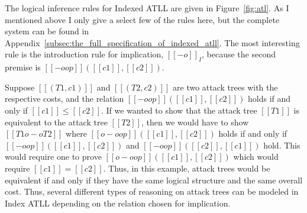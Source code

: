 The logical inference rules for Indexed ATLL are given in
Figure~\ref{fig:atl}.  As I mentioned above I only give a select few
of the rules here, but the complete system can be found in
Appendix~\ref{subsec:the_full_specification_of_indexed_atll}.  The
  most interesting rule is the introduction rule for implication,
  $[[-o]]_I$, because the second premise is $[[-oop]]([[c1]],[[c2]])$.

Suppose $[[(T1,c1)]]$ and $[[(T2,c2)]]$ are two attack trees with the
respective costs, and the relation $[[-oop]]([[c1]],[[c2]])$ holds if
and only if $[[c1]] \leq [[c2]]$. If we wanted to show that the attack
tree $[[T1]]$ is equivalent to the attack tree $[[T2]]$, then we would
have to show $[[T1 o-o T2]]$ where $[[o-oop]]([[c1]],[[c2]])$
holds if and only if $[[-oop]]([[c1]],[[c2]])$ and
$[[-oop]]([[c2]],[[c1]])$ hold.  This would require one to prove
$[[o-oop]]([[c1]],[[c2]])$ which would require $[[c1]] = [[c2]]$.
Thus, in this example, attack trees would be equivalent if and only if
they have the same logical structure and the same overall cost.  Thus,
several different types of reasoning on attack trees can be modeled in
Index ATLL depending on the relation chosen for implication.
